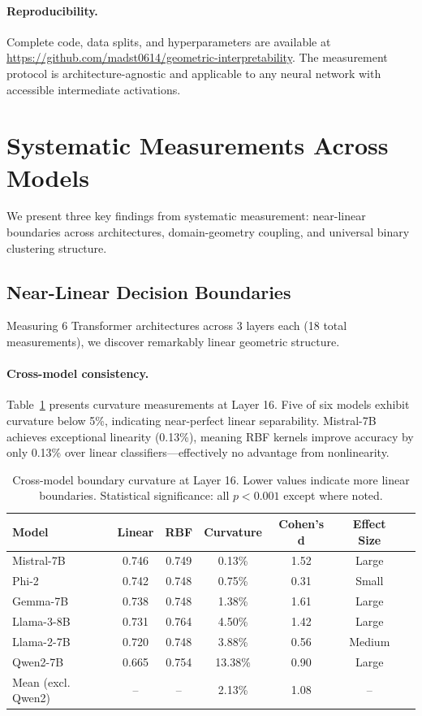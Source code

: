 \documentclass[11pt]{article}
\begin{document}
\paragraph{Reproducibility.} Complete code, data splits, and hyperparameters are available at \url{https://github.com/madst0614/geometric-interpretability}. The measurement protocol is architecture-agnostic and applicable to any neural network with accessible intermediate activations.

\section{Systematic Measurements Across Models}
\label{sec:results}

We present three key findings from systematic measurement: near-linear boundaries across architectures, domain-geometry coupling, and universal binary clustering structure.

\subsection{Near-Linear Decision Boundaries}
\label{sec:results-linearity}

Measuring 6 Transformer architectures across 3 layers each (18 total measurements), we discover remarkably linear geometric structure.

\paragraph{Cross-model consistency.} Table~\ref{tab:cross-model} presents curvature measurements at Layer 16. Five of six models exhibit curvature below 5\%, indicating near-perfect linear separability. Mistral-7B achieves exceptional linearity (0.13\%), meaning RBF kernels improve accuracy by only 0.13\% over linear classifiers---effectively no advantage from nonlinearity.

\begin{table}[h]
\centering
\caption{Cross-model boundary curvature at Layer 16. Lower values indicate more linear boundaries. Statistical significance: all $p < 0.001$ except where noted.}
\label{tab:cross-model}
\begin{tabular}{lcccccc}
\toprule
Model & Linear & RBF & Curvature & Cohen's d & Effect Size \\
\midrule
Mistral-7B & 0.746 & 0.749 & 0.13\% & 1.52 & Large \\
Phi-2 & 0.742 & 0.748 & 0.75\% & 0.31 & Small \\
Gemma-7B & 0.738 & 0.748 & 1.38\% & 1.61 & Large \\
Llama-3-8B & 0.731 & 0.764 & 4.50\% & 1.42 & Large \\
Llama-2-7B & 0.720 & 0.748 & 3.88\% & 0.56 & Medium \\
Qwen2-7B & 0.665 & 0.754 & 13.38\% & 0.90 & Large \\
\midrule
Mean (excl. Qwen2) & -- & -- & 2.13\% & 1.08 & -- \\
\bottomrule
\end{tabular}
\end{table}
\end{document}
